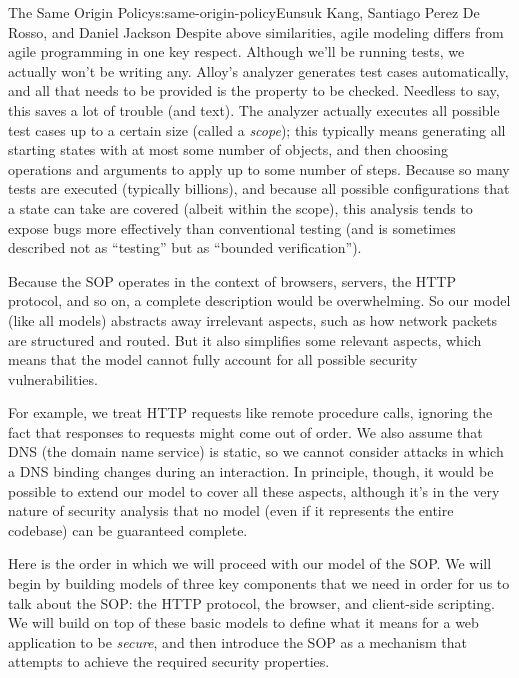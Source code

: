\begin{aosachapter}{The Same Origin Policy}{s:same-origin-policy}{Eunsuk Kang, Santiago Perez De Rosso, and Daniel Jackson}
Despite above similarities, agile modeling differs from agile
programming in one key respect. Although we'll be running tests, we
actually won't be writing any. Alloy's analyzer generates test cases
automatically, and all that needs to be provided is the property to be
checked. Needless to say, this saves a lot of trouble (and text). The
analyzer actually executes all possible test cases up to a certain size
(called a \emph{scope}); this typically means generating all starting
states with at most some number of objects, and then choosing operations
and arguments to apply up to some number of steps. Because so many tests
are executed (typically billions), and because all possible
configurations that a state can take are covered (albeit within the
scope), this analysis tends to expose bugs more effectively than
conventional testing (and is sometimes described not as ``testing'' but
as ``bounded verification'').

\label{simplifications}

Because the SOP operates in the context of browsers, servers, the HTTP
protocol, and so on, a complete description would be overwhelming. So
our model (like all models) abstracts away irrelevant aspects, such as
how network packets are structured and routed. But it also simplifies
some relevant aspects, which means that the model cannot fully account
for all possible security vulnerabilities.

For example, we treat HTTP requests like remote procedure calls,
ignoring the fact that responses to requests might come out of order. We
also assume that DNS (the domain name service) is static, so we cannot
consider attacks in which a DNS binding changes during an interaction.
In principle, though, it would be possible to extend our model to cover
all these aspects, although it's in the very nature of security analysis
that no model (even if it represents the entire codebase) can be
guaranteed complete.

\label{roadmap}

Here is the order in which we will proceed with our model of the SOP. We
will begin by building models of three key components that we need in
order for us to talk about the SOP: the HTTP protocol, the browser, and
client-side scripting. We will build on top of these basic models to
define what it means for a web application to be \emph{secure}, and then
introduce the SOP as a mechanism that attempts to achieve the required
security properties.


\end{aosachapter}
